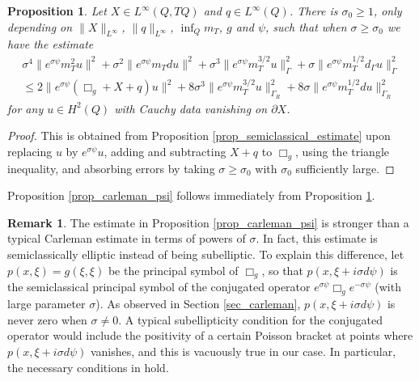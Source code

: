 \documentclass[11pt,letterpaper]{amsart}
\newtheorem{Proposition}[Theorem]{Proposition}
\theoremstyle{definition}
\newtheorem{Remark}[Theorem]{Remark}
\numberwithin{equation}{section}
\newcommand{\norm}[1]{\lVert #1 \rVert}         %
\newcommand{\p}{\partial}
\def\p{\partial}
\begin{document}
\begin{Proposition} \label{prop_carleman_sigma_general}
Let $X \in L^{\infty}(Q, TQ)$ and $q \in L^{\infty}(Q)$. There is $\sigma_0 \geq 1$, only depending on $\norm{X}_{L^{\infty}}$, $\norm{q}_{L^{\infty}}$, $\inf_{Q} m_T$, $g$ and $\psi$, such that when $\sigma \geq \sigma_0$ we have the estimate 
\begin{align*}
\sigma^4 \norm{e^{\sigma \psi} m_T^2 u}^2 + \sigma^2 \norm{e^{\sigma \psi} m_T d u}^2 + \sigma^3 \norm{e^{\sigma \psi} m_T^{3/2} u}_{\Gamma}^2 + \sigma \norm{e^{\sigma \psi} m_T^{1/2} d_{\Gamma} u}_{\Gamma}^2 \\
 \leq 2 \norm{e^{\sigma \psi} (\Box_g + X + q) u}^2 + 8 \sigma^3 \norm{e^{\sigma \psi} m_T^{3/2} u}_{\Gamma_R}^2 + 8 \sigma \norm{e^{\sigma \psi} m_T^{1/2} d u}_{\Gamma_R}^2
\end{align*}
for any $u \in H^2(Q)$ with Cauchy data vanishing on $\p X$.
\end{Proposition}
\begin{proof}
This is obtained from Proposition \ref{prop_semiclassical_estimate} upon replacing $u$ by $e^{\sigma \psi} u$, adding and subtracting $X+q$ to $\Box_g$, using the triangle inequality, and absorbing errors by taking $\sigma \geq \sigma_0$ with $\sigma_0$ sufficiently large.
\end{proof}

Proposition \ref{prop_carleman_psi} follows immediately from Proposition \ref{prop_carleman_sigma_general}.

 \begin{Remark}
The estimate in Proposition \ref{prop_carleman_psi} is stronger than a typical Carleman estimate in terms of powers of $\sigma$. In fact, this estimate is semiclassically elliptic instead of being subelliptic. To explain this difference, let $p(x,\xi) = g(\xi, \xi)$ be the principal symbol of $\Box_g$, so that $p(x,\xi+i \sigma d\psi)$ is the semiclassical principal symbol of the conjugated operator $e^{\sigma \psi} \Box_g e^{-\sigma \psi}$ (with large parameter $\sigma$). As observed in Section \ref{sec_carleman}, $p(x,\xi+i \sigma d\psi)$ is never zero when $\sigma \neq 0$. 
A typical subellipticity condition for the conjugated operator would include the positivity of a certain Poisson bracket at points where $p(x,\xi+i \sigma d\psi)$ vanishes, and this is vacuously true in our case. In particular, the necessary conditions in \cite[Theorems 28.2.1 and 28.2.1']{hormander} hold.
\end{Remark}
\end{document}

